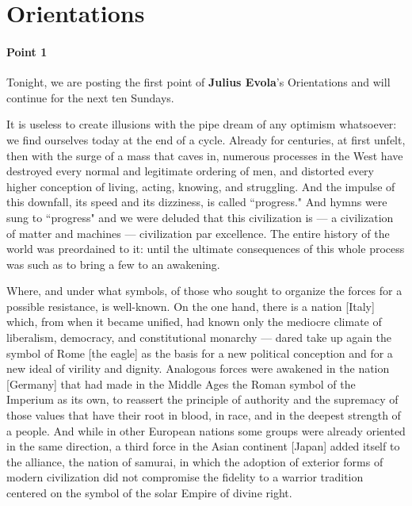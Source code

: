 \section{Orientations}

\paragraph{Point 1}
\begin{quotex}
Tonight, we are posting the first point of \textbf{Julius Evola}'s Orientations and will continue for the next ten Sundays. 

\end{quotex}
It is useless to create illusions with the pipe dream of any optimism whatsoever: we find ourselves today at the end of a cycle. Already for centuries, at first unfelt, then with the surge of a mass that caves in, numerous processes in the West have destroyed every normal and legitimate ordering of men, and distorted every higher conception of living, acting, knowing, and struggling. And the impulse of this downfall, its speed and its dizziness, is called ``progress." And hymns were sung to ``progress" and we were deluded that this civilization is — a civilization of matter and machines — civilization par excellence. The entire history of the world was preordained to it: until the ultimate consequences of this whole process was such as to bring a few to an awakening.

Where, and under what symbols, of those who sought to organize the forces for a possible resistance, is well-known. On the one hand, there is a nation [Italy] which, from when it became unified, had known only the mediocre climate of liberalism, democracy, and constitutional monarchy — dared take up again the symbol of Rome [the eagle] as the basis for a new political conception and for a new ideal of virility and dignity. Analogous forces were awakened in the nation [Germany] that had made in the Middle Ages the Roman symbol of the Imperium as its own, to reassert the principle of authority and the supremacy of those values that have their root in blood, in race, and in the deepest strength of a people. And while in other European nations some groups were already oriented in the same direction, a third force in the Asian continent [Japan] added itself to the alliance, the nation of samurai, in which the adoption of exterior forms of modern civilization did not compromise the fidelity to a warrior tradition centered on the symbol of the solar Empire of divine right.

